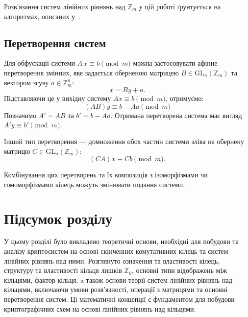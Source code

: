 Розв’язання систем лінійних рівнянь над \(\mathbb{Z}_m\) у цій роботі ґрунтується на алгоритмах, описаних у~\cite{7}.

\subsection{Перетворення систем}
\label{subsec:sle_transformations}

Для обфускації системи \(A\,x \equiv b \pmod m\) можна застосовувати афінне перетворення змінних, яке задається оберненою матрицею \(B \in \mathrm{GL}_n(\mathbb{Z}_m)\) та вектором зсуву \(a \in \mathbb{Z}_m^n\):
\[
    x = B y + a.
\]
Підставляючи це у вихідну систему \(Ax \equiv b \pmod m\), отримуємо:
\[
    (A B) y \equiv b - A a \pmod{m}
\]
Позначимо \(A' = A B\) та \(b' = b - A a\).
Отримана перетворена система має вигляд \(A' y \equiv b' \pmod m\).

Інший тип перетворення — домноження обох частин системи зліва на обернену матрицю \(C \in \mathrm{GL}_n(\mathbb{Z}_m)\):
\[
    (C A) x \equiv C b \pmod m.
\]

Комбінування цих перетворень та їх композиція з ізоморфізмами чи гомоморфізмами кілець можуть змінювати подання системи.

\section{Підсумок розділу}
\label{sec:synthesis_summary}

У цьому розділі було викладено теоретичні основи, необхідні для побудови та аналізу криптосистем на основі скінченних комутативних кілець та систем лінійних рівнянь над ними.
Розглянуто означення та властивості кілець, структуру та властивості кільця лишків \(\mathbb{Z}_k\), основні типи відображень між кільцями, фактор-кільця,
a також основи теорії систем лінійних рівнянь над кільцями, включаючи умови розв’язності, операції з матрицями та основні перетворення систем.
Ці математичні концепції є фундаментом для побудови криптографічних схем на основі лінійних рівнянь над кільцями.
